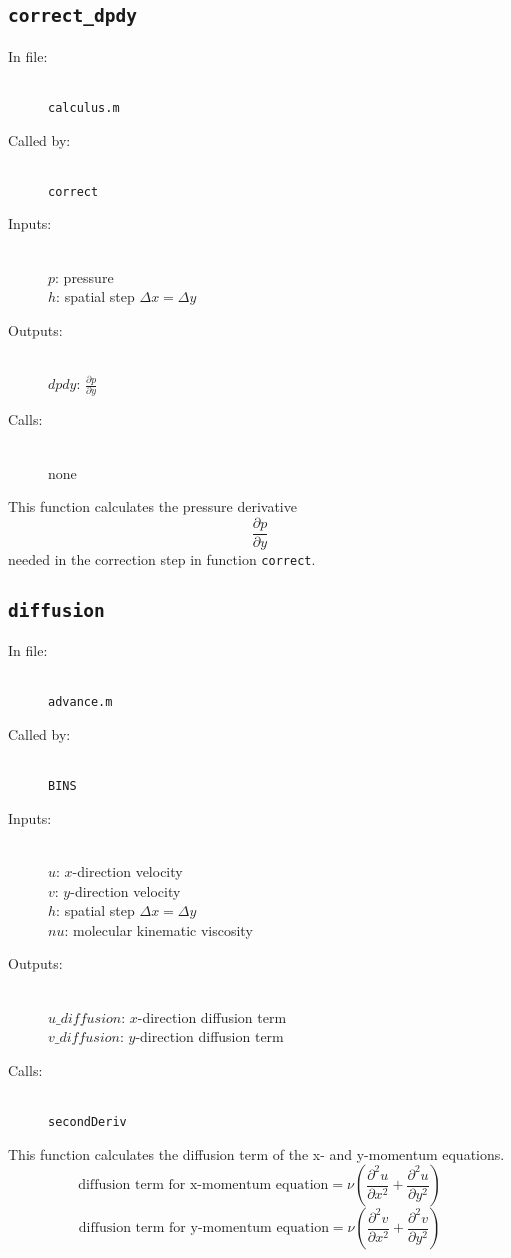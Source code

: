 \documentclass[12pt]{article}
\begin{document}
\subsection{\texttt{correct\_dpdy}}
\begin{description}
\item[In file:] \hfill \\ \texttt{calculus.m}
\item[Called by:] \hfill \\ \texttt{correct}
\item[Inputs:] \hfill \\ $p$: pressure \\ $h$: spatial step $\Delta x = \Delta y$
\item[Outputs:] \hfill \\ $dpdy$: $\frac{\partial p}{\partial y}$
\item[Calls:] \hfill \\ none
\end{description}
This function calculates the pressure derivative
\[ \frac{\partial p}{\partial y}\]
needed in the correction step in function \texttt{correct}.

\subsection{\texttt{diffusion}}
\begin{description}
\item[In file:] \hfill \\ \texttt{advance.m}
\item[Called by:] \hfill \\ \texttt{BINS}
\item[Inputs:] \hfill \\ $u$: $x$-direction velocity \\ $v$: $y$-direction velocity \\ $h$: spatial step $\Delta x = \Delta y$ \\ $nu$: molecular kinematic viscosity
\item[Outputs:] \hfill \\ $u\_diffusion$: $x$-direction diffusion term \\ $v\_diffusion$: $y$-direction diffusion term 
\item[Calls:] \hfill \\ \texttt{secondDeriv}
\end{description}
This function calculates the diffusion term of the x- and y-momentum equations.
\[ \text{diffusion term for x-momentum equation} = \nu \left(\frac{\partial^2 u}{\partial x^2} + \frac{\partial^2 u}{\partial y^2}\right) \]
\[ \text{diffusion term for y-momentum equation} = \nu \left(\frac{\partial^2 v}{\partial x^2} + \frac{\partial^2 v}{\partial y^2}\right) \]
\end{document}
